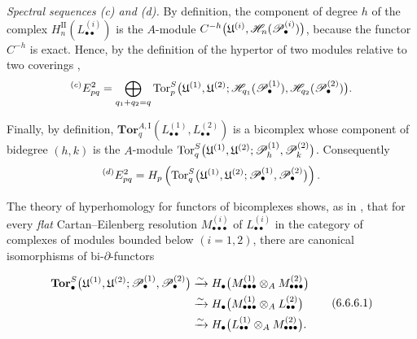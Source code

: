 
\begin{env}[6.6.5]
\label{III.6.6.5}
\emph{Spectral sequences \textnormal{(c)} and
\textnormal{(d)}.}
By definition, the component of degree $h$ of the complex
$H_n^{\mathrm{II}}(L_{\bullet\bullet}^{(i)})$ is the
$A$-module $C^{-h}
\bigl(
\mathfrak U^{(i)},
\mathscr{H}_n(\mathscr{P}_\bullet^{(i)})
\bigr)$,
because the functor $C^{-h}$ is exact.  Hence, by the definition
of the hypertor of two modules relative to two coverings
,
\[
  {}^{(c)}E_{pq}^2
  =
  \bigoplus_{q_1+q_2=q}
  \operatorname{Tor}_p^S
  \bigl(
    \mathfrak U^{(1)},\mathfrak U^{(2)};
    \mathscr{H}_{q_1}(\mathscr{P}_\bullet^{(1)}),
    \mathscr{H}_{q_2}(\mathscr{P}_\bullet^{(2)})
  \bigr).
\]

Finally, by definition, $\mathbf{Tor}_q^{A,\mathrm I}
(L_{\bullet\bullet}^{(1)},L_{\bullet\bullet}^{(2)})$
is a bicomplex whose component of bidegree $(h,k)$ is the
$A$-module $\operatorname{Tor}_q^S
\bigl(
\mathfrak U^{(1)},\mathfrak U^{(2)};
\mathscr{P}_h^{(1)},\mathscr{P}_k^{(2)}
\bigr)$.
Consequently
\[
  {}^{(d)}E_{pq}^2
  =
  H_p\left(
    \operatorname{Tor}_q^S
    \bigl(
      \mathfrak U^{(1)},\mathfrak U^{(2)};
      \mathscr{P}_\bullet^{(1)},\mathscr{P}_\bullet^{(2)}
    \bigr)
  \right).
\]
\end{env}

\begin{env}[6.6.6]
\label{III.6.6.6}
The theory of hyperhomology for functors of bicomplexes
 shows, as in , that for
every \emph{flat} Cartan--Eilenberg resolution
$M_{\bullet\bullet\bullet}^{(i)}$ of $L_{\bullet\bullet}^{(i)}$ in the
category of complexes of modules bounded below $(i=1,2)$, there
are canonical isomorphisms of bi-$\partial$-functors
\begin{env}[6.6.6.1]
\label{III.6.6.6.1}
\[
\begin{split}
  \mathbf{Tor}_\bullet^S
  \bigl(
    \mathfrak U^{(1)},\mathfrak U^{(2)};
    \mathscr{P}_\bullet^{(1)},\mathscr{P}_\bullet^{(2)}
  \bigr)
  &\xrightarrow{\sim}
  H_\bullet
  \bigl(
    M_{\bullet\bullet\bullet}^{(1)}
    \otimes_A M_{\bullet\bullet\bullet}^{(2)}
  \bigr)\\
  &\xrightarrow{\sim}
  H_\bullet
  \bigl(
    M_{\bullet\bullet\bullet}^{(1)}
    \otimes_A L_{\bullet\bullet}^{(2)}
  \bigr)\\
  &\xrightarrow{\sim}
  H_\bullet
  \bigl(
    L_{\bullet\bullet}^{(1)}
    \otimes_A M_{\bullet\bullet\bullet}^{(2)}
  \bigr).
\end{split}
\tag{6.6.6.1}
\]
\end{env}
\end{env}

